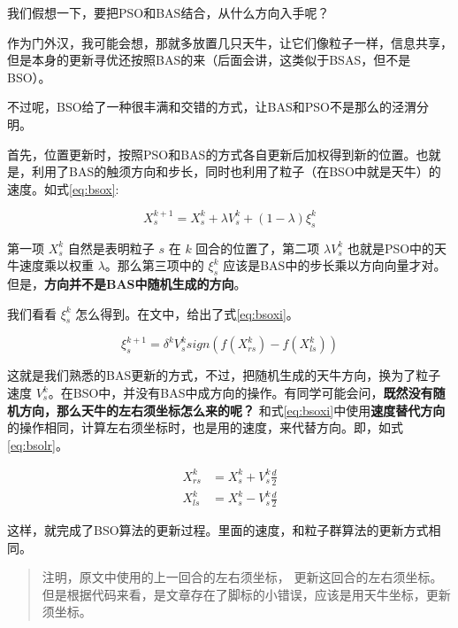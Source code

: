 \documentclass[]{ctexbook}
\theoremstyle{definition}
\theoremstyle{definition}
\theoremstyle{definition}
\theoremstyle{remark}
\begin{document}
我们假想一下，要把PSO和BAS结合，从什么方向入手呢？

作为门外汉，我可能会想，那就多放置几只天牛，让它们像粒子一样，信息共享，但是本身的更新寻优还按照BAS的来（后面会讲，这类似于BSAS，但不是BSO）。

不过呢，BSO给了一种很丰满和交错的方式，让BAS和PSO不是那么的泾渭分明。

首先，位置更新时，按照PSO和BAS的方式各自更新后加权得到新的位置。也就是，利用了BAS的触须方向和步长，同时也利用了粒子（在BSO中就是天牛）的速度。如式\eqref{eq:bsox}:

\begin{equation}
X_{s}^{k+1} = X_{s}^{k} + \lambda V_{s}^k + (1 - \lambda)\xi_{s}^k
\label{eq:bsox}
\end{equation}

第一项 \(X_{s}^{k}\) 自然是表明粒子 \(s\) 在 \(k\) 回合的位置了，第二项
\(\lambda V_{s}^k\) 也就是PSO中的天牛速度乘以权重
\(\lambda\)。那么第三项中的 \(\xi_{s}^k\)
应该是BAS中的步长乘以方向向量才对。但是，\textbf{方向并不是BAS中随机生成的方向}。

我们看看 \(\xi_s^k\) 怎么得到。在文中，给出了式\eqref{eq:bsoxi}。

\begin{equation}
\xi_s^{k+1} = \delta^kV_s^ksign(f(X_{rs}^k) - f(X_{ls}^k))
\label{eq:bsoxi}
\end{equation}

这就是我们熟悉的BAS更新的方式，不过，把随机生成的天牛方向，换为了粒子速度
\(V_s^k\)。在BSO中，并没有BAS中成方向的操作。有同学可能会问，\textbf{既然没有随机方向，那么天牛的左右须坐标怎么来的呢？}
和式\eqref{eq:bsoxi}中使用\textbf{速度替代方向}的操作相同，计算左右须坐标时，也是用的速度，来代替方向。即，如式\eqref{eq:bsolr}。

\begin{equation}
\begin{split}
X_{rs}^k&=X_{s}^k+V_s^k\frac{d}{2} \\
X_{ls}^k&=X_{s}^k-V_s^k\frac{d}{2}
\end{split}
\label{eq:bsolr}
\end{equation}

这样，就完成了BSO算法的更新过程。里面的速度，和粒子群算法的更新方式相同。

\begin{quote}
注明，原文中使用的上一回合的左右须坐标，
更新这回合的左右须坐标。但是根据代码来看，是文章存在了脚标的小错误，应该是用天牛坐标，更新须坐标。
\end{quote}
\end{document}
